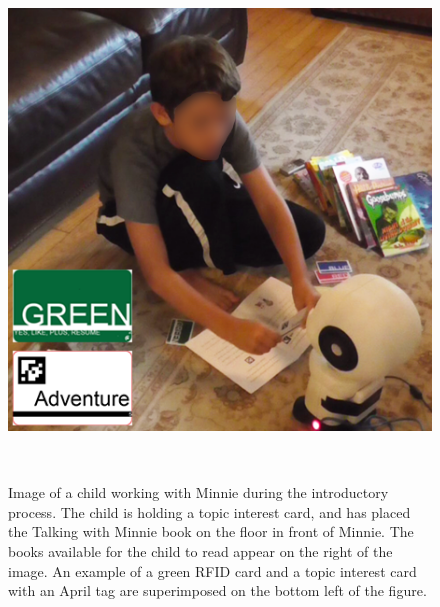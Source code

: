\documentclass{sigchi}
\begin{document}
\begin{figure}
	\centering
	\includegraphics[width=1\columnwidth]{figures/childWithMinnie_2}
	\caption{Image of a child working with Minnie during the introductory process. The child is holding a topic interest card, and has placed the Talking with Minnie book on the floor in front of Minnie. The books available for the child to read appear on the right of the image. An example of a green RFID card and a topic interest card with an April tag are superimposed on the bottom left of the figure.}~\label{fig:figure3}
\end{figure}
\end{document}
